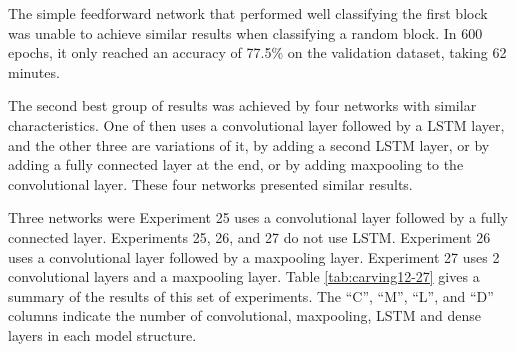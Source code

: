 The simple feedforward network that performed well classifying the first block was unable to achieve similar results when classifying a random block. In 600 epochs, it only reached an accuracy of 77.5\% on the validation dataset, taking 62 minutes.

The second best group of results was achieved by four networks with similar characteristics. One of then uses a convolutional layer followed by a LSTM layer, and the other three are variations of it, by adding a second LSTM layer, or by adding a fully connected layer at the end, or by adding maxpooling to the convolutional layer. These four networks presented similar results.


Three networks were 
Experiment 25 uses a convolutional layer followed by a fully connected layer.
Experiments 25, 26, and 27 do not use LSTM. Experiment 26 uses a convolutional layer followed by a maxpooling layer. 
Experiment 27 uses 2 convolutional layers and a maxpooling layer.
Table \ref{tab:carving12-27} gives a summary of the results of this set of experiments. The ``C'', ``M'', ``L'', and ``D'' columns indicate the number of convolutional, maxpooling, LSTM and dense layers in each model structure.


